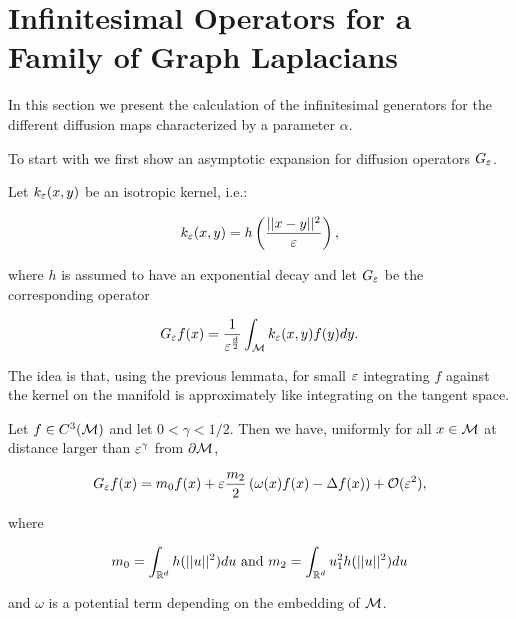 \section{Infinitesimal Operators for a Family of Graph Laplacians}
In this section we present the calculation of the infinitesimal generators for the different diffusion maps characterized by a parameter $\alpha$.

To start with we first show an asymptotic expansion for diffusion operators $G_\varepsilon$.

Let $k_\varepsilon(x,y)$ be an isotropic kernel, i.e.:

\begin{equation*}
k_\varepsilon(x,y)=h\left(\frac{||x-y||^2}{\varepsilon} \right),
\end{equation*}

where $h$ is assumed to have an exponential decay and let $G_\varepsilon$ be the corresponding operator

\begin{equation*}
G_\varepsilon f(x)=\frac{1}{\varepsilon^\frac{d}{2}}\int_{\mathcal{M}} k_\varepsilon(x,y)f(y)dy.
\end{equation*}

The idea is that, using the previous lemmata, for small $\varepsilon$ integrating $f$ against the kernel on the manifold is approximately like integrating on the tangent space.

\begin{theorem}\label{diffOpExpansion}
Let $f\in C^3(\mathcal{M})$ and let $0 <\gamma<1/2$. Then we have, uniformly for all $x\in\mathcal{M}$ at distance larger than $\varepsilon^\gamma$ from $\partial\mathcal{M}$,

\begin{equation*}
G_\varepsilon f(x)=m_0 f(x)+\varepsilon\frac{m_2}{2}\left(\omega(x)f(x)-\Delta f(x) \right)+\mathcal{O}(\varepsilon^2),
\end{equation*}

where

\begin{equation*}
m_0=\int_{\mathbb{R}^d} h(||u||^2)du \text{ and } m_2=\int_{\mathbb{R}^d} u_1^2 h(||u||^2)du
\end{equation*}

and $\omega$ is a potential term depending on the embedding of $\mathcal{M}$.
\end{theorem}

